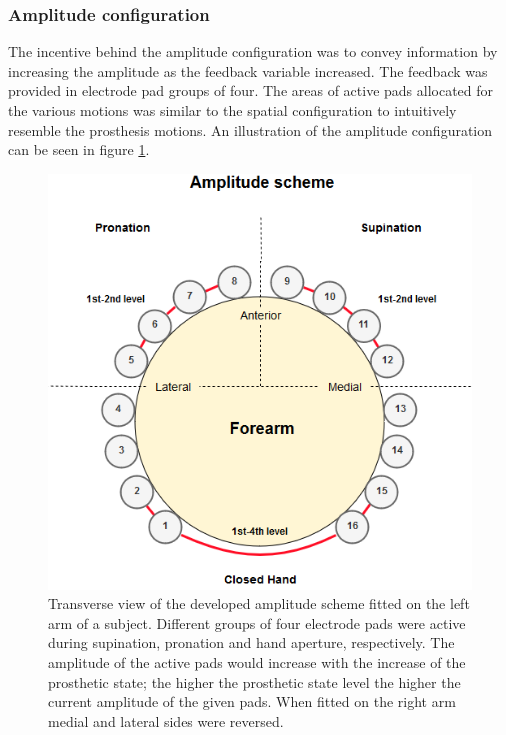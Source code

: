 \subsubsection{Amplitude configuration}
The incentive behind the amplitude configuration was to convey information by increasing the amplitude as the feedback variable increased. The feedback was provided in electrode pad groups of four.
The areas of active pads allocated for the various motions was similar to the spatial configuration to intuitively resemble the prosthesis motions. An illustration of the amplitude configuration can be seen in figure \ref{fig:pa:amplitude}. 
 \begin{figure}[h]                 
	\includegraphics[width=.9\textwidth]{figures/El_array_amplitude}  
	\caption{Transverse view of the developed amplitude scheme fitted on the left arm of a subject. Different groups of four electrode pads were active during supination, pronation and hand aperture, respectively. The amplitude of the active pads would increase with the increase of the prosthetic state; the higher the prosthetic state level the higher the current amplitude of the given pads. When fitted on the right arm medial and lateral sides were reversed.}
	\label{fig:pa:amplitude} 
\end{figure}


